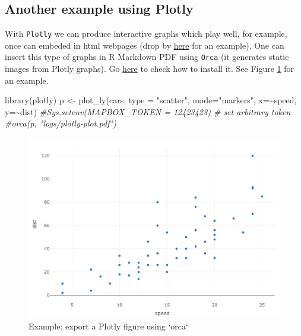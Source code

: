 \documentclass[
  12pt,
]{article}
\newenvironment{Shaded}{\begin{snugshade}}{\end{snugshade}}
\newcommand{\AttributeTok}[1]{\textcolor[rgb]{0.77,0.63,0.00}{#1}}
\newcommand{\CommentTok}[1]{\textcolor[rgb]{0.56,0.35,0.01}{\textit{#1}}}
\newcommand{\FunctionTok}[1]{\textcolor[rgb]{0.00,0.00,0.00}{#1}}
\newcommand{\NormalTok}[1]{#1}
\newcommand{\OtherTok}[1]{\textcolor[rgb]{0.56,0.35,0.01}{#1}}
\newcommand{\SpecialCharTok}[1]{\textcolor[rgb]{0.00,0.00,0.00}{#1}}
\newcommand{\StringTok}[1]{\textcolor[rgb]{0.31,0.60,0.02}{#1}}
\begin{document}
\hypertarget{another-example-using-plotly}{%
\subsection{Another example using Plotly}\label{another-example-using-plotly}}

With \texttt{Plotly} we can produce interactive graphs which play well, for example, once can embeded in html webpages (drop by \href{https://paulcbauer.shinyapps.io/visualizing-causal-scenarios/}{here} for an example). One can insert this type of graphs in R Markdown PDF using \texttt{Orca} (it generates static images from Plotly graphs). Go \href{https://github.com/plotly/orca\#installation}{here} to check how to install it. See Figure \ref{fig:fig-3} for an example.

\begin{Shaded}
\begin{Highlighting}[]
\FunctionTok{library}\NormalTok{(plotly)}
\NormalTok{p }\OtherTok{\textless{}{-}} \FunctionTok{plot\_ly}\NormalTok{(cars, }\AttributeTok{type =} \StringTok{"scatter"}\NormalTok{, }\AttributeTok{mode=}\StringTok{"markers"}\NormalTok{,}
        \AttributeTok{x=}\SpecialCharTok{\textasciitilde{}}\NormalTok{speed,}
        \AttributeTok{y=}\SpecialCharTok{\textasciitilde{}}\NormalTok{dist)}
\CommentTok{\#Sys.setenv(\textquotesingle{}MAPBOX\_TOKEN\textquotesingle{} = \textquotesingle{}12423423\textquotesingle{}) \# set arbitrary token}
\CommentTok{\#orca(p, "logs/plotly{-}plot.pdf")}
\end{Highlighting}
\end{Shaded}

\begin{figure}[ht]
\centering
\caption{Example: export a Plotly figure using `orca`}\label{fig:fig-3}
        \includegraphics[width=0.9\linewidth]{logs/plotly-plot.pdf}
\begin{flushleft}
\end{flushleft}
\end{figure}
\vspace{-1.2cm}
\end{document}
